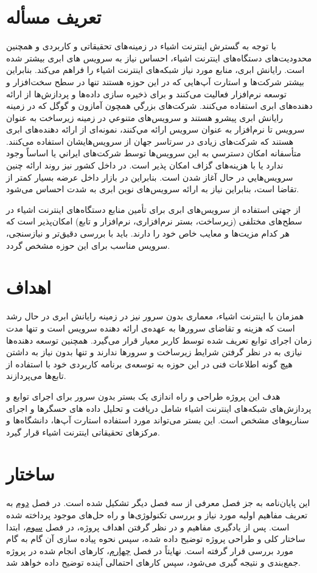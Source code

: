 \section{تعریف مسأله}

با توجه به گسترش اینترنت اشیاء در زمینه‌های تحقیقاتی و کاربردی و همچنین محدودیت‌های دستگاه‌های ‌‌اینترنت اشیاء، احساس نیاز به سرویس های ابری بیشتر شده است. رایانش ابری، منابع مورد نیاز شبکه‌های اینترنت اشیاء را فراهم می‌کند. بنابراین بیشتر شرکت‌ها و استارت آپ‌هایی که در این حوزه هستند تنها در سطح سخت‌افزار و توسعه نرم‌افزار فعالیت می‌کنند و برای ذخیره سازی داده‌ها و پردازش‌ها از ارائه دهنده‌های ابری استفاده می‌کنند. شركت‌های بزرگي همچون آمازون و گوگل كه در زمينه رایانش ابری پيشرو هستند و سرويس‌های متنوعي در زمينه زیرساخت به عنوان سرویس تا نرم‌افزار به عنوان سرویس ارائه مي‌كنند، نمونه‌ای از ارائه دهنده‌های ابری هستند که شرکت‌های زیادی در سرتاسر جهان از سرویس‌هایشان استفاده می‌کنند. متأسفانه امكان دسترسي به اين سرويس‌ها توسط شرکت‌های ايراني يا اساساً وجود ندارد يا با هزينه‌های گزاف امكان پذير است. در داخل كشور نيز روند ارائه چنين سرويس‌هايي در حال آغاز شدن است. بنابراين در بازار داخل عرضه بسيار كمتر از تقاضا است، بنابراين نياز به ارائه سرويس‌های نوین ابری به شدت احساس می‌شود.

از جهتی استفاده از سرویس‌های ابری برای تأمین منابع دستگاه‌های اینترنت اشیاء در سطح‌های مختلفی (زیرساخت، بستر نرم‌افزاری، نرم‌افزار و تابع) امکان‌پذیر است که هر کدام مزیت‌‌ها و معایب خاص خود را دارند. باید با بررسی دقیق‌تر و نیازسنجی، سرویس مناسب برای این حوزه مشخص گردد.

\section{اهداف}

همزمان با اینترنت اشیاء، معماری بدون سرور نیز در زمینه رایانش ابری در حال رشد است که هزینه و تقاضای سرورها به عهده‌ی ارائه دهنده سرویس است و تنها مدت زمان اجرای توابع تعریف شده توسط کاربر معیار قرار می‌گیرد. همچنین توسعه دهنده‌ها نیازی به در نظر گرفتن شرايط زيرساخت و سرورها ندارند و تنها بدون نیاز به داشتن هیچ گونه اطلاعات فنی در این حوزه‌ به توسعه‌ی برنامه کاربردی خود با استفاده از تابع‌ها می‌پردازند.

هدف این پروژه طراحی و راه اندازی یک بستر بدون سرور برای اجرای توابع و پردازش‌های شبکه‌های اینترنت اشیاء شامل دریافت و تحلیل داده های حسگرها و اجرای سناریوهای مشخص است. این بستر می‌تواند مورد استفاده استارت آپ‌ها، دانشگاه‌ها و مرکزهای تحقیقاتی اینترنت اشیاء قرار گیرد.

\section{ساختار}

این پایان‌نامه به جز فصل معرفی از سه فصل دیگر تشکیل شده است. در فصل \hyperref[chapter2]{دوم} به تعریف مفاهیم اولیه مورد نیاز و بررسی تکنولوژی‌ها و راه حل‌های موجود ‌پرداخته شده است. پس از یادگیری مفاهیم و در نظر گرفتن اهداف پروژه، در فصل \hyperref[chapter3]{سوم}، ابتدا ساختار کلی و طراحی پروژه توضیح داده شده، سپس نحوه پیاده سازی آن گام به گام مورد بررسی قرار گرفته است. نهایتاً در فصل \hyperref[chapter4]{چهارم}، کار‌های انجام شده در پروژه جمع‌بندی و نتیجه گیری می‌شود، سپس کارهای احتمالی آینده توضیح داده خواهد شد.

